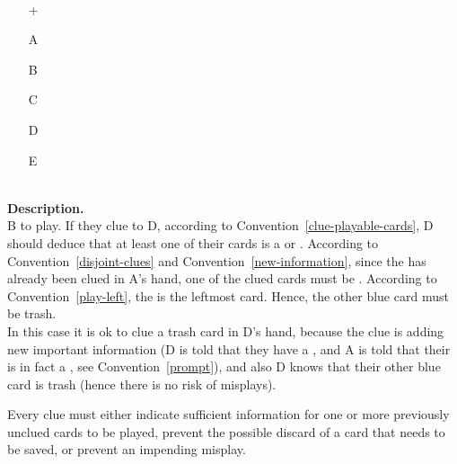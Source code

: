 \begin{example} \hfill \\
	\begin{minipage}{0.45\textwidth}
		\begin{itemize}
			\item[\Large +]      
			\item[\Large A]    
			\item[\Large B]    
			\item[\Large C]    
			\item[\Large D]    
			\item[\Large E]    
		\end{itemize}
	\end{minipage}%
	\begin{minipage}{0.55\textwidth}
		\hfill \\
		
		\textbf{Description.} \\
		
		B to play. If they clue  to D, according to Convention~\ref{clue-playable-cards}, D should deduce that at least one of their cards is a  or . According to Convention~\ref{disjoint-clues} and Convention~\ref{new-information}, since the  has already been clued in A's hand, one of the clued cards must be . According to Convention~\ref{play-left}, the  is the leftmost card. Hence, the other blue card must be trash. \\
	
		In this case it is ok to clue a trash card in D's hand, because the clue is adding new important information (D is told that they have a , and A is told that their  is in fact a , see Convention~\ref{prompt}), and also D knows that their other blue card is trash (hence there is no risk of misplays).
	\end{minipage}
\end{example} \vspace{0.15 cm}

\begin{convention}
	\label{new-information}
	Every clue must either indicate sufficient information for one or more previously unclued cards to be played, prevent the possible discard of a card that needs to be saved, or prevent an impending misplay.
\end{convention}

